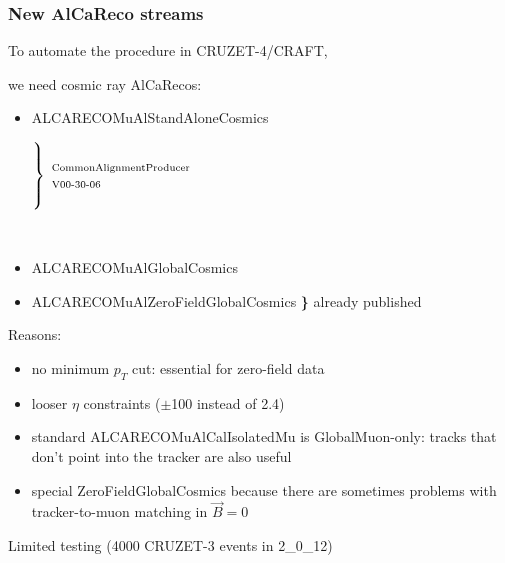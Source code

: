 \documentclass[compress]{beamer}
\begin{document}
\begin{frame}
\frametitle{New AlCaReco streams}
\small

To automate the procedure in CRUZET-4/CRAFT,

we need cosmic ray AlCaRecos:
\begin{itemize}\setlength{\itemsep}{0.3 cm}
\item ALCARECOMuAlStandAloneCosmics \hfill \begin{minipage}{3.5 cm}
$\displaystyle \left\}\begin{array}{l} \mbox{ } \\ \mbox{\scriptsize CommonAlignmentProducer} \\ \mbox{\scriptsize V00-30-06} \\ \mbox{ } \end{array}\right.$

\vspace{-1 cm} \mbox{ } \end{minipage}
\item ALCARECOMuAlGlobalCosmics
\item ALCARECOMuAlZeroFieldGlobalCosmics \hspace{0.27 cm} {\bf \}} {\scriptsize already published}
\end{itemize}

\vfill
Reasons:
\begin{itemize}
\item no minimum $p_T$ cut: essential for zero-field data
\item looser $\eta$ constraints ($\pm$100 instead of 2.4)
\item standard ALCARECOMuAlCalIsolatedMu is GlobalMuon-only: tracks that don't point into the tracker are also useful
\item special ZeroFieldGlobalCosmics because there are sometimes problems with tracker-to-muon matching in $\vec{B}=0$
\end{itemize}

\vfill
Limited testing (4000 CRUZET-3 events in 2\_0\_12)
\end{frame}


\end{document}

